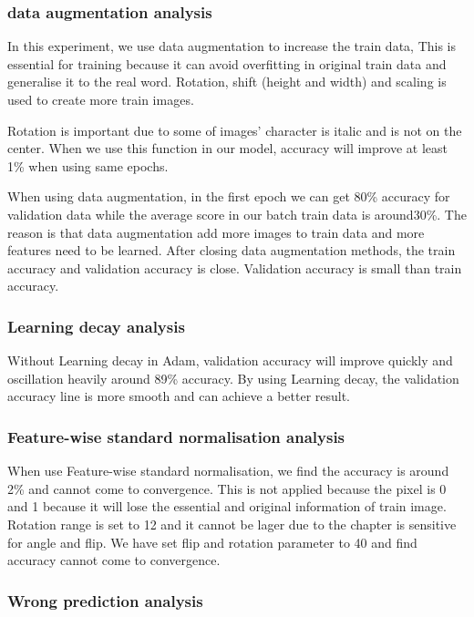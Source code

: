 \documentclass[twoside,twocolumn]{article}
\begin{document}
\subsubsection{data augmentation analysis}

In this experiment, we use data augmentation to increase the train data, This is essential for training because it can avoid overfitting in original train data and generalise it to the real word. Rotation, shift (height and width) and scaling is used to create more train images. 

Rotation is important due to some of images’ character is italic and is not on the center. When we use this function in our model, accuracy will improve at least 1\% when using same epochs.

When using data augmentation, in the first epoch we can get 80\% accuracy for validation data while the average score in our batch train data is around30\%. The reason is that data augmentation add more images to train data and more features need to be learned. After closing data augmentation  methods, the train accuracy and validation accuracy is close. Validation accuracy is small than train accuracy. 

\subsubsection{Learning decay analysis}
Without Learning decay in Adam, validation accuracy will improve quickly and oscillation heavily around 89\% accuracy. By using Learning decay, the validation accuracy line is more smooth and can achieve a better result.

\subsubsection{Feature-wise standard normalisation analysis}
When use Feature-wise standard normalisation, we find the accuracy is around 2\% and cannot come to convergence. This is not applied because the pixel is 0 and 1 because it will lose the essential and original information of train image. Rotation range is set to 12 and it cannot be lager due to the chapter is sensitive for angle and flip. We have set flip and rotation parameter to 40 and find accuracy cannot come to convergence. 

\subsubsection{Wrong prediction analysis}
\end{document}
